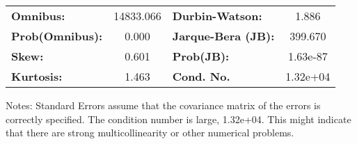 \begin{center}
\begin{tabular}{lcccccc}
\bottomrule
\end{tabular}
\begin{tabular}{lclc}
\textbf{Omnibus:}       & 14833.066 & \textbf{  Durbin-Watson:     } &    1.886  \\
\textbf{Prob(Omnibus):} &    0.000  & \textbf{  Jarque-Bera (JB):  } &  399.670  \\
\textbf{Skew:}          &    0.601  & \textbf{  Prob(JB):          } & 1.63e-87  \\
\textbf{Kurtosis:}      &    1.463  & \textbf{  Cond. No.          } & 1.32e+04  \\
\bottomrule
\end{tabular}
\end{center}

Notes: \newline
 [1] Standard Errors assume that the covariance matrix of the errors is correctly specified. \newline
 [2] The condition number is large, 1.32e+04. This might indicate that there are \newline
 strong multicollinearity or other numerical problems.